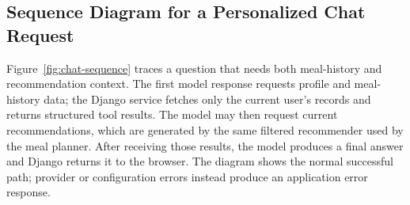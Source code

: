 \documentclass[12pt,a4paper]{report}
\begin{document}
\subsection{Sequence Diagram for a Personalized Chat Request}
Figure~\ref{fig:chat-sequence} traces a question that needs both meal-history and
recommendation context. The first model response requests profile and meal-history data;
the Django service fetches only the current user's records and returns structured tool
results. The model may then request current recommendations, which are generated by the
same filtered recommender used by the meal planner. After receiving those results, the
model produces a final answer and Django returns it to the browser. The diagram shows
the normal successful path; provider or configuration errors instead produce an
application error response.
\end{document}
